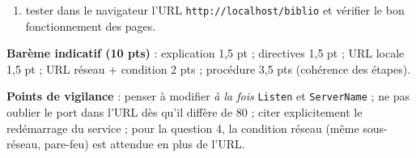 \documentclass[11pt]{article}
\begin{document}
\begin{corrige}
\begin{enumerate}
\begin{enumerate}
\item tester dans le navigateur l'URL \texttt{http://localhost/biblio} et vérifier le bon fonctionnement des pages.
\end{enumerate}
\end{enumerate}
\textbf{Barème indicatif (10 pts)} : explication 1,5 pt ; directives 1,5 pt ; URL locale 1,5 pt ; URL réseau + condition 2 pts ; procédure 3,5 pts (cohérence des étapes).\par
\textbf{Points de vigilance} : penser à modifier \emph{à la fois} \texttt{Listen} et \texttt{ServerName} ; ne pas oublier le port dans l'URL dès qu'il diffère de 80 ; citer explicitement le redémarrage du service ; pour la question 4, la condition réseau (même sous-réseau, pare-feu) est attendue en plus de l'URL.
\end{corrige}
\end{document}

